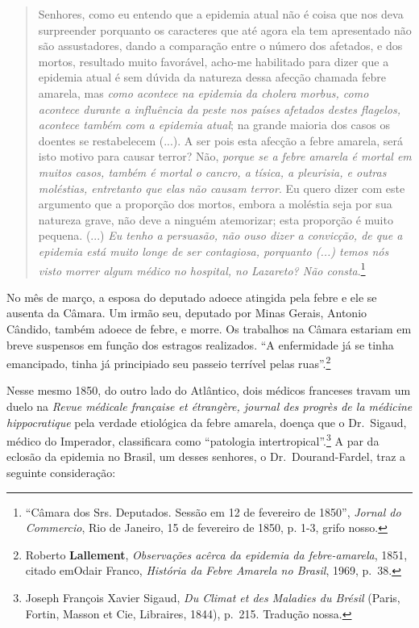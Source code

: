 \begin{quote}
Senhores, como eu entendo que a epidemia atual não é coisa que nos deva
surpreender porquanto os caracteres que até agora ela tem apresentado
não são assustadores, dando a comparação entre o número dos afetados, e
dos mortos, resultado muito favorável, acho-me habilitado para dizer que
a epidemia atual é sem dúvida da natureza dessa afecção chamada febre
amarela, mas \emph{como acontece na epidemia da cholera morbus, como
acontece durante a influência da peste nos países afetados destes
flagelos, acontece também com a epidemia atual}; na grande maioria dos
casos os doentes se restabelecem (...). A ser pois esta afecção a febre
amarela, será isto motivo para causar terror? Não, \emph{porque se a
febre amarela é mortal em muitos casos, também é mortal o cancro, a
tísica, a pleurisia, e outras moléstias, entretanto que elas não causam
terror}. Eu quero dizer com este argumento que a proporção dos mortos,
embora a moléstia seja por sua natureza grave, não deve a ninguém
atemorizar; esta proporção é muito pequena. (...) \emph{Eu tenho a
persuasão, não ouso dizer a convicção, de que a epidemia está muito
longe de ser contagiosa, porquanto (...) temos nós visto morrer algum
médico no hospital, no Lazareto? Não consta}.\footnote{``Câmara dos Srs.
  Deputados. Sessão em 12 de fevereiro de 1850'', \emph{Jornal do
  Commercio}, Rio de Janeiro, 15 de fevereiro de 1850, p. 1-3, grifo
  nosso.}
\end{quote}

No mês de março, a esposa do deputado adoece atingida pela febre e ele
se ausenta da Câmara. Um irmão seu, deputado por Minas Gerais, Antonio
Cândido, também adoece de febre, e morre. Os trabalhos na Câmara
estariam em breve suspensos em função dos estragos realizados. ``A
enfermidade já se tinha emancipado, tinha já principiado seu passeio
terrível pelas ruas''.\footnote{Roberto \textbf{Lallement},
  \emph{Observações acêrca da epidemia da febre-amarela}, 1851, citado
  emOdair Franco, \emph{História da Febre Amarela no Brasil}, 1969,
  p.~38.}

Nesse mesmo 1850, do outro lado do Atlântico, dois médicos franceses
travam um duelo na \emph{Revue médicale française et étrangère, journal
des progrès de la médicine hippocratique} pela verdade etiológica da
febre amarela, doença que o Dr.~Sigaud, médico do Imperador,
classificara como ``patologia intertropical''.\footnote{Joseph François
  Xavier Sigaud, \emph{Du Climat et des Maladies du Brésil} (Paris,
  Fortin, Masson et Cie, Libraires, 1844), p.~215. Tradução nossa.} A
par da eclosão da epidemia no Brasil, um desses senhores, o
Dr.~Dourand-Fardel, traz a seguinte consideração:

